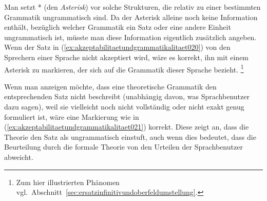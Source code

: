 Man setzt * (den \textit{Asterisk}) vor solche Strukturen, die relativ zu einer bestimmten Grammatik ungrammatisch sind.
Da der Asterisk alleine noch keine Information enthält, bezüglich welcher Grammatik ein Satz oder eine andere Einheit ungrammatisch ist, müsste man diese Information eigentlich zusätzlich angeben.
Wenn der Satz in (\ref{ex:akzeptabilitaetundgrammatikalitaet020}) von den Sprechern einer Sprache nicht akzeptiert wird, wäre es korrekt, ihn mit einem Asterisk zu markieren, der sich auf die Grammatik dieser Sprache bezieht.%
\footnote{Zum hier illustrierten Phänomen vgl.\ Abschnitt~\ref{sec:ersatzinfinitivundoberfeldumstellung}.}

\begin{exe}
\end{exe}

Wenn man anzeigen möchte, dass eine theoretische Grammatik den entsprechenden Satz nicht beschreibt (unabhängig davon, was Sprachbenutzer dazu sagen), weil sie vielleicht noch nicht vollständig oder nicht exakt genug formuliert ist, wäre eine Markierung wie in (\ref{ex:akzeptabilitaetundgrammatikalitaet021}) korrekt.
Diese zeigt an, dass die Theorie den Satz als ungrammatisch einstuft, auch wenn dies bedeutet, dass die Beurteilung durch die formale Theorie von den Urteilen der Sprachbenutzer abweicht.
\begin{exe}
\end{exe}

